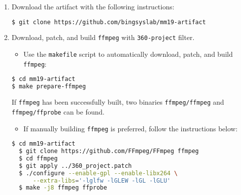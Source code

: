 \begin{enumerate}[leftmargin=*]
\item Download the artifact with the following instructions:
\begin{lstlisting}[language=bash, numbers=none,  morekeywords={make, git, clone}]
$ git clone https://github.com/bingsyslab/mm19-artifact
\end{lstlisting}


\item Download, patch, and build {\tt ffmpeg} with {\tt 360-project} filter.
  \begin{itemize}[leftmargin=*]
  \item Use the {\tt makefile} script to automatically download, patch, and build {\tt ffmpeg}:
  \end{itemize}
\begin{lstlisting}[language=bash, numbers=none,  morekeywords={make, git, clone}]
$ cd mm19-artifact
$ make prepare-ffmpeg
\end{lstlisting}
If {\tt ffmpeg} has been successfully built, two binaries {\tt ffmpeg/ffmpeg} and {\tt ffmpeg/ffprobe} can be found.

\begin{itemize}[leftmargin=*]
\item If manually building {\tt ffmpeg} is preferred, follow the instructions below:
\end{itemize}
\begin{lstlisting}[language=bash, numbers=none, morekeywords={make, git, clone}, deletekeywords={enable}]
  $ cd mm19-artifact
  $ git clone https://github.com/FFmpeg/FFmpeg ffmpeg
  $ cd ffmpeg
  $ git apply ../360_project.patch
  $ ./configure --enable-gpl --enable-libx264 \
      --extra-libs='-lglfw -lGLEW -lGL -lGLU'
  $ make -j8 ffmpeg ffprobe
\end{lstlisting}


\end{enumerate}
